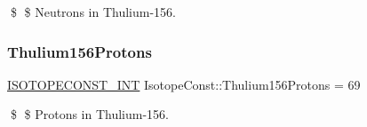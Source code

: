 \$ \$ Neutrons in Thulium-\/156. \mbox{\label{group___isotope_const-_thulium-_tm156_gadd54835a26bbfc34f439a4481a07b537}} 
\subsubsection{\texorpdfstring{Thulium156\+Protons}{Thulium156Protons}}
{\footnotesize\ttfamily \mbox{\hyperlink{group___isotope_const-_macros_ga5f18360b3e99483a35c32d789e62621c}{I\+S\+O\+T\+O\+P\+E\+C\+O\+N\+S\+T\+\_\+\+I\+NT}} Isotope\+Const\+::\+Thulium156\+Protons = 69}

\$ \$ Protons in Thulium-\/156. 